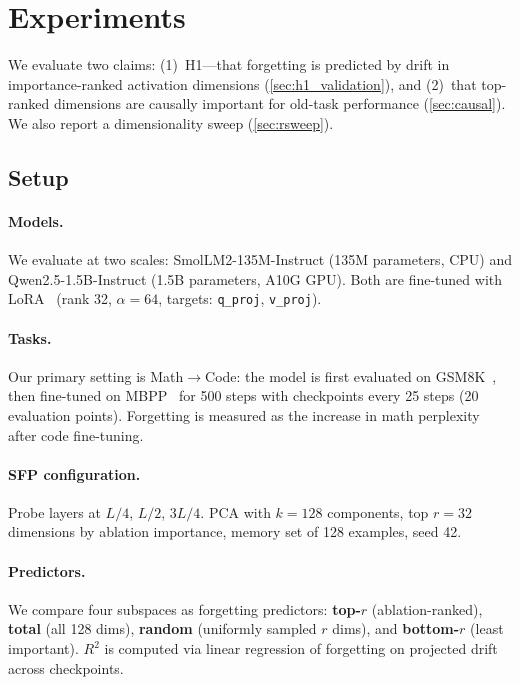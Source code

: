 \section{Experiments}
\label{sec:experiments}

We evaluate two claims: (1)~H1---that forgetting is predicted by drift in importance-ranked activation dimensions (\cref{sec:h1_validation}), and (2)~that top-ranked dimensions are causally important for old-task performance (\cref{sec:causal}).
We also report a dimensionality sweep (\cref{sec:rsweep}).

\subsection{Setup}
\label{sec:setup}

\paragraph{Models.}
We evaluate at two scales: SmolLM2-135M-Instruct (135M parameters, CPU) and Qwen2.5-1.5B-Instruct (1.5B parameters, A10G GPU).
Both are fine-tuned with LoRA~\citep{hu2022lora} (rank 32, $\alpha = 64$, targets: \texttt{q\_proj}, \texttt{v\_proj}).

\paragraph{Tasks.}
Our primary setting is Math$\to$Code: the model is first evaluated on GSM8K~\citep{cobbe2021training}, then fine-tuned on MBPP~\citep{austin2021program} for 500 steps with checkpoints every 25 steps (20 evaluation points).
Forgetting is measured as the increase in math perplexity after code fine-tuning.

\paragraph{SFP configuration.}
Probe layers at $L/4$, $L/2$, $3L/4$.
PCA with $k = 128$ components, top $r = 32$ dimensions by ablation importance, memory set of 128 examples, seed 42.

\paragraph{Predictors.}
We compare four subspaces as forgetting predictors: \textbf{top-$r$} (ablation-ranked), \textbf{total} (all 128 dims), \textbf{random} (uniformly sampled $r$ dims), and \textbf{bottom-$r$} (least important).
$R^2$ is computed via linear regression of forgetting on projected drift across checkpoints.

